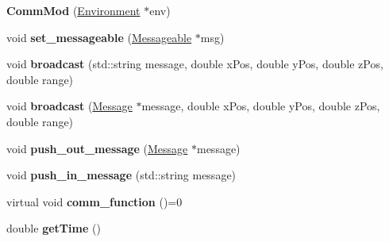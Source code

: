 \begin{DoxyCompactItemize}
\item 
{\bfseries Comm\+Mod} (\hyperlink{class_environment}{Environment} $\ast$env)\hypertarget{class_comm_mod_a00ab1077257c3672f8036468aecbf234}{}\label{class_comm_mod_a00ab1077257c3672f8036468aecbf234}

\item 
void {\bfseries set\+\_\+messageable} (\hyperlink{class_messageable}{Messageable} $\ast$msg)\hypertarget{class_comm_mod_ab2e096b71516134bc0cb9bae4a965ef7}{}\label{class_comm_mod_ab2e096b71516134bc0cb9bae4a965ef7}

\item 
void {\bfseries broadcast} (std\+::string message, double x\+Pos, double y\+Pos, double z\+Pos, double range)\hypertarget{class_comm_mod_abcfe15ea4ed5b27d77d2613cc4e786a3}{}\label{class_comm_mod_abcfe15ea4ed5b27d77d2613cc4e786a3}

\item 
void {\bfseries broadcast} (\hyperlink{class_message}{Message} $\ast$message, double x\+Pos, double y\+Pos, double z\+Pos, double range)\hypertarget{class_comm_mod_af3e34b66c07a5c1e35a806443d0bca8c}{}\label{class_comm_mod_af3e34b66c07a5c1e35a806443d0bca8c}

\item 
void {\bfseries push\+\_\+out\+\_\+message} (\hyperlink{class_message}{Message} $\ast$message)\hypertarget{class_comm_mod_a696711acc752f9c2c60865194de3287f}{}\label{class_comm_mod_a696711acc752f9c2c60865194de3287f}

\item 
void {\bfseries push\+\_\+in\+\_\+message} (std\+::string message)\hypertarget{class_comm_mod_a2acc6cb30eb7c9d55e3893da147db839}{}\label{class_comm_mod_a2acc6cb30eb7c9d55e3893da147db839}

\item 
virtual void {\bfseries comm\+\_\+function} ()=0\hypertarget{class_comm_mod_a48b1d970ce600043bf2b610ae113e825}{}\label{class_comm_mod_a48b1d970ce600043bf2b610ae113e825}

\item 
double {\bfseries get\+Time} ()\hypertarget{class_comm_mod_a7415ee1b2835f8cb0d650df6ed80622a}{}\label{class_comm_mod_a7415ee1b2835f8cb0d650df6ed80622a}

\end{DoxyCompactItemize}
